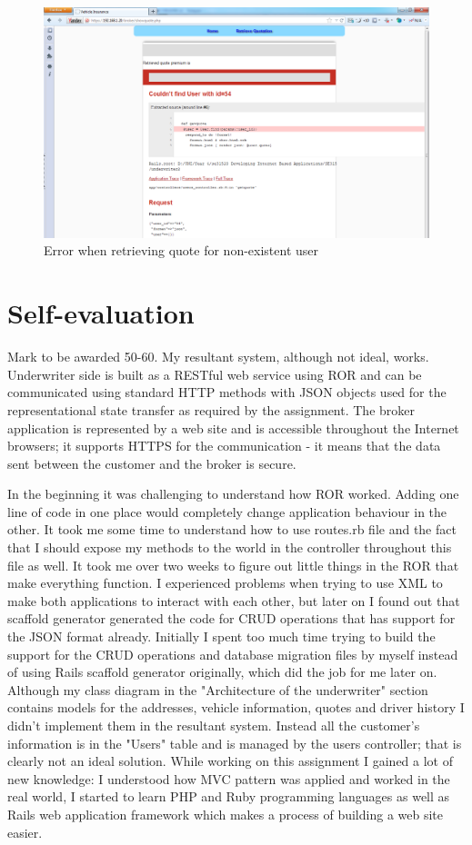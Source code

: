 \documentclass[10pt,a4paper,headinclude=true,twoside]{report}
\begin{document}
\begin{figure}[H]
\centering
\centerline{\includegraphics[scale=0.45]{./retriveQuoteError}}
\caption{Error when retrieving quote for non-existent user}
\label{fig:retriveQuoteError}
\end{figure} 
\newpage
\section{Self-evaluation}
Mark to be awarded 50-60. My resultant system, although not ideal, works. Underwriter side is built as a RESTful web service using ROR and can be communicated using standard HTTP methods with JSON objects used for the representational state transfer as required by the assignment. The broker application is represented by a web site and is accessible throughout the Internet browsers; it supports HTTPS for the communication - it means that the data sent between the customer and the broker is secure.

In the beginning it was challenging to understand how ROR worked. Adding one line of code in one place would completely change application behaviour in the other. It took me some time to understand how to use routes.rb file and the fact that I should expose my methods to the world in the controller throughout this file as well. It took me over two weeks to figure out little things in the ROR that make everything function. I experienced problems when trying to use XML to make both applications to interact with each other, but later on I found out that scaffold generator generated the code for CRUD operations that has support for the JSON format already. Initially I spent too much time trying to build the support for the CRUD operations and database migration files by myself instead of using Rails scaffold generator originally, which did the job for me later on. Although my class diagram in the "Architecture of the underwriter" section contains models for the addresses, vehicle information, quotes and driver history I didn't implement them in the resultant system. Instead all the customer's information is in the "Users" table and is managed by the users controller; that is clearly not an ideal solution. While working on this assignment I gained a lot of new knowledge: I understood how MVC pattern was applied and worked in the real world, I started to learn PHP and Ruby programming languages as well as Rails web application framework which makes a process of building a web site easier.
\end{document}
